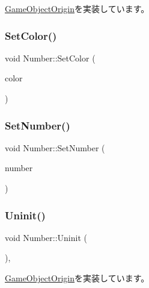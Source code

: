 \mbox{\hyperlink{class_game_object_origin_af9af378a4fd9028316a6fdb461ed6a10}{Game\+Object\+Origin}}を実装しています。

\mbox{\label{class_number_a1ea98cdee888a040f4530a6654657c44}} 
\subsubsection{\texorpdfstring{Set\+Color()}{SetColor()}}
{\footnotesize\ttfamily void Number\+::\+Set\+Color (\begin{DoxyParamCaption}\item[{\mbox{\hyperlink{_vector3_d_8h_a680c30c4a07d86fe763c7e01169cd6cc}{X\+Color4}}}]{color }\end{DoxyParamCaption})}

\mbox{\label{class_number_ac825b1ee1f46a6ac4ffd3bc904964745}} 
\subsubsection{\texorpdfstring{Set\+Number()}{SetNumber()}}
{\footnotesize\ttfamily void Number\+::\+Set\+Number (\begin{DoxyParamCaption}\item[{int}]{number }\end{DoxyParamCaption})}

\mbox{\label{class_number_a7c3bf9c55f7a0a19d80129c5f07f99f2}} 
\subsubsection{\texorpdfstring{Uninit()}{Uninit()}}
{\footnotesize\ttfamily void Number\+::\+Uninit (\begin{DoxyParamCaption}{ }\end{DoxyParamCaption})\hspace{0.3cm}{\ttfamily [override]}, {\ttfamily [virtual]}}



\mbox{\hyperlink{class_game_object_origin_aeac8fc4a1f625982313a9a60dd35d016}{Game\+Object\+Origin}}を実装しています。



